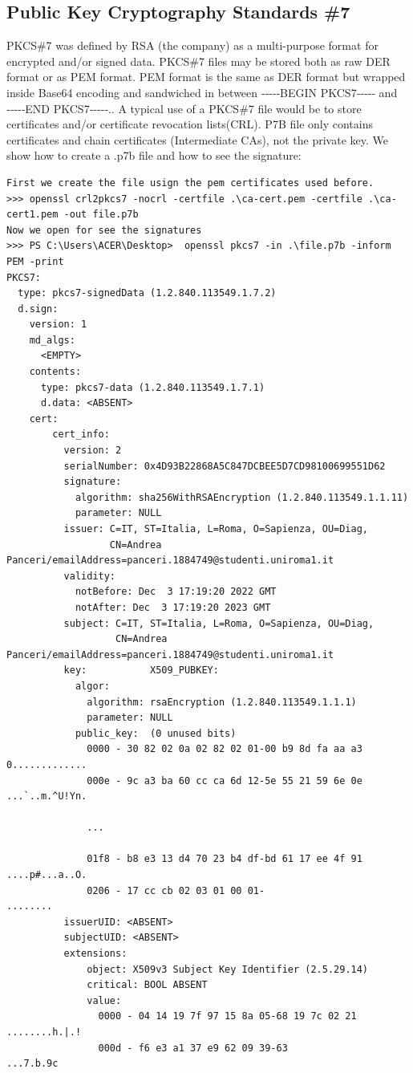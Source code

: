 \documentclass{article}
\begin{document}
\subsection{Public Key Cryptography Standards \#7}
PKCS\#7 was defined by RSA (the company) as a multi-purpose format for encrypted and/or signed data. PKCS\#7 files may be stored both as raw DER format or as PEM format. PEM format is the same as DER format but wrapped inside Base64 encoding and sandwiched in between ‑‑‑‑‑BEGIN PKCS7‑‑‑‑‑ and ‑‑‑‑‑END PKCS7‑‑‑‑‑.. A typical use of a PKCS\#7 file would be to store certificates and/or certificate revocation lists(CRL). P7B file only contains certificates and chain certificates (Intermediate CAs), not the private key. We show how to create a .p7b file and how to see the signature:\\
\begin{lstlisting}[basicstyle=\tiny]
First we create the file usign the pem certificates used before.
>>> openssl crl2pkcs7 -nocrl -certfile .\ca-cert.pem -certfile .\ca-cert1.pem -out file.p7b
Now we open for see the signatures
>>> PS C:\Users\ACER\Desktop>  openssl pkcs7 -in .\file.p7b -inform PEM -print
PKCS7:
  type: pkcs7-signedData (1.2.840.113549.1.7.2)
  d.sign:
    version: 1
    md_algs:
      <EMPTY>
    contents:
      type: pkcs7-data (1.2.840.113549.1.7.1)
      d.data: <ABSENT>
    cert:
        cert_info:
          version: 2
          serialNumber: 0x4D93B22868A5C847DCBEE5D7CD98100699551D62
          signature:
            algorithm: sha256WithRSAEncryption (1.2.840.113549.1.1.11)
            parameter: NULL
          issuer: C=IT, ST=Italia, L=Roma, O=Sapienza, OU=Diag, 
                  CN=Andrea Panceri/emailAddress=panceri.1884749@studenti.uniroma1.it
          validity:
            notBefore: Dec  3 17:19:20 2022 GMT
            notAfter: Dec  3 17:19:20 2023 GMT
          subject: C=IT, ST=Italia, L=Roma, O=Sapienza, OU=Diag, 
                   CN=Andrea Panceri/emailAddress=panceri.1884749@studenti.uniroma1.it
          key:           X509_PUBKEY:
            algor:
              algorithm: rsaEncryption (1.2.840.113549.1.1.1)
              parameter: NULL
            public_key:  (0 unused bits)
              0000 - 30 82 02 0a 02 82 02 01-00 b9 8d fa aa a3   0.............
              000e - 9c a3 ba 60 cc ca 6d 12-5e 55 21 59 6e 0e   ...`..m.^U!Yn.

              ... 
              
              01f8 - b8 e3 13 d4 70 23 b4 df-bd 61 17 ee 4f 91   ....p#...a..O.
              0206 - 17 cc cb 02 03 01 00 01-                    ........
          issuerUID: <ABSENT>
          subjectUID: <ABSENT>
          extensions:
              object: X509v3 Subject Key Identifier (2.5.29.14)
              critical: BOOL ABSENT
              value:
                0000 - 04 14 19 7f 97 15 8a 05-68 19 7c 02 21   ........h.|.!
                000d - f6 e3 a1 37 e9 62 09 39-63               ...7.b.9c


\end{lstlisting}
\end{document}
